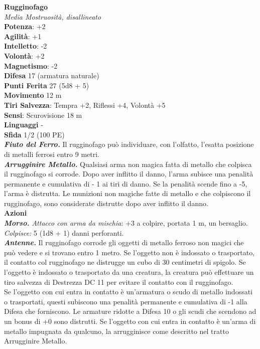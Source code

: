 \begin{multicols}{2}
\medskip\textbf{Rugginofago}\\
\emph{Media Mostruosità, disallineato}\\
\textbf{Potenza}: +2\\
\textbf{Agilità}: +1\\
\textbf{Intelletto}: -2\\
\textbf{Volontà}: +2\\
\textbf{Magnetismo}: -2\\
\textbf{Difesa} 17 (armatura naturale)\\
\textbf{Punti Ferita} 27 (5d8 + 5)\\
\textbf{Movimento} 12 m\\
\textbf{Tiri Salvezza}: Tempra +2, Riflessi +4, Volontà +5\\
\textbf{Sensi}: Scurovisione 18 m\\
\textbf{Linguaggi} -\\
\textbf{Sfida} 1/2 (100 PE)\smallskip\\
\emph{\textbf{Fiuto del Ferro.}} Il rugginofago può individuare, con l'olfatto, l'esatta posizione di metalli ferrosi entro 9 metri.\\
\emph{\textbf{Arrugginire Metallo.}} Qualsiasi arma non magica fatta di metallo che colpisca il rugginofago si corrode. Dopo aver inflitto il danno, l'arma subisce una penalità permanente e cumulativa di - 1 ai tiri di danno. Se la penalità scende fino a -5, l'arma è distrutta. Le munizioni non magiche fatte di metallo e che colpiscono il rugginofago, sono considerate distrutte dopo aver inflitto il danno. \\
\smallskip\textbf{Azioni}\\
\emph{\textbf{Morso.} Attacco con arma da mischia}: +3 a colpire, portata 1 m, un bersaglio.
\emph{Colpisce:} 5 (1d8 + 1) danni perforanti.\\
\emph{\textbf{Antenne.}} Il rugginofago corrode gli oggetti di metallo ferroso non magici che può vedere e si trovano entro 1 metro. Se l'oggetto non è indossato o trasportato, il contatto col rugginofago ne distrugge un cubo di 30 centimetri di spigolo. Se l'oggetto è indossato o trasportato da una creatura, la creatura può effettuare un tiro salvezza di Destrezza DC 11 per evitare il contatto con il rugginofago. \\
Se l'oggetto con cui entra in contatto è un'armatura o scudo di metallo indossati o trasportati, questi subiscono una penalità permanente e cumulativa di -1 alla Difesa che forniscono. Le armature ridotte a Difesa 10 o gli scudi che scendono ad un bonus di +0 sono distrutti. Se l'oggetto con cui entra in contatto è un'arma di metallo impugnata da qualcuno, la arrugginisce come descritto nel tratto Arrugginire Metallo. 

\end{multicols}
